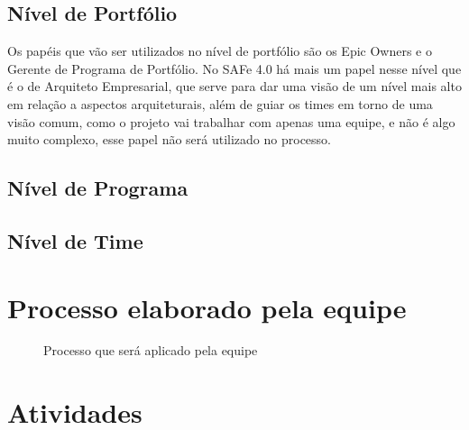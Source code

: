 \subsection{Nível de Portfólio}
Os papéis que vão ser utilizados no nível de portfólio são os Epic Owners e o Gerente de Programa de Portfólio. No SAFe 4.0 há mais um papel nesse nível que é o de Arquiteto Empresarial, que serve para dar uma visão de um nível mais alto em relação a aspectos arquiteturais, além de guiar os times em torno de uma visão comum,  como o projeto vai trabalhar com apenas uma equipe, e não é algo muito complexo, esse papel não será utilizado no processo.

\subsection{Nível de Programa}

\subsection{Nível de Time}

\section{Processo elaborado pela equipe}
\begin{figure}[!htpb]
\centering
\caption{Processo que será aplicado pela equipe}
\end{figure}

\section{Atividades}

